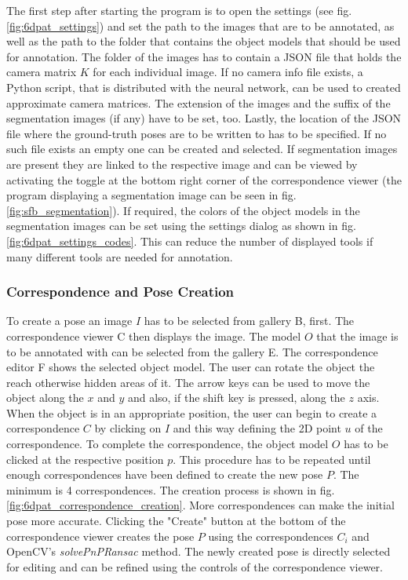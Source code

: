 The first step after starting the program is to open the settings (see fig. \ref{fig:6dpat_settings}) and set the path to the images that are to be annotated, as well as the path to the folder that contains the object models that should be used for annotation. The folder of the images has to contain a JSON file that holds the camera matrix $K$ for each individual image. If no camera info file exists, a Python script, that is distributed with the neural network, can be used to created approximate camera matrices. The extension of the images and the suffix of the segmentation images (if any) have to be set, too. Lastly, the location of the JSON file where the ground-truth poses are to be written to has to be specified. If no such file exists an empty one can be created and selected. If segmentation images are present they are linked to the respective image and can be viewed by activating the toggle at the bottom right corner of the correspondence viewer (the program displaying a segmentation image can be seen in fig. \ref{fig:sfb_segmentation}). If required, the colors of the object models in the segmentation images can be set using the settings dialog as shown in fig. \ref{fig:6dpat_settings_codes}. This can reduce the number of displayed tools if many different tools are needed for annotation.

\subsubsection{Correspondence and Pose Creation}

To create a pose an image $I$ has to be selected from gallery B, first. The correspondence viewer C then displays the image. The model $O$ that the image is to be annotated with can be selected from the gallery E. The correspondence editor F shows the selected object model. The user can rotate the object the reach otherwise hidden areas of it. The arrow keys can be used to move the object along the $x$ and $y$ and also, if the shift key is pressed, along the $z$ axis. When the object is in an appropriate position, the user can begin to create a correspondence $C$ by clicking on $I$ and this way defining the 2D point $u$ of the correspondence. To complete the correspondence, the object model $O$ has to be clicked at the respective position $p$. This procedure has to be repeated until enough correspondences have been defined to create the new pose $P$. The minimum is 4 correspondences. The creation process is shown in fig. \ref{fig:6dpat_correspondence_creation}. More correspondences can make the initial pose more accurate. Clicking the "Create" button at the bottom of the correspondence viewer creates the pose $P$ using the correspondences $C_i$ and OpenCV's \textit{solvePnPRansac} method. The newly created pose is directly selected for editing and can be refined using the controls of the correspondence viewer.

